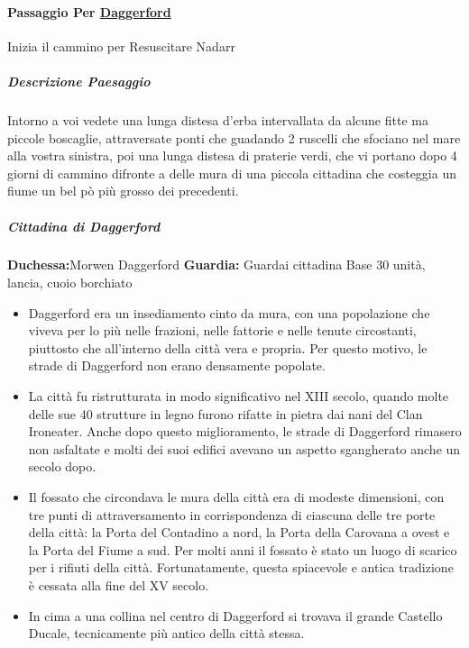 \documentclass{article}
\begin{document}
            \paragraph{Passaggio Per \href{https://forgottenmaps.web.app/map/Daggerford}{Daggerford}} Inizia il cammino per Resuscitare Nadarr
            \subparagraph{Descrizione Paesaggio} Intorno a voi vedete una lunga distesa d'erba intervallata da alcune fitte ma piccole boscaglie, attraversate ponti che guadando 2 ruscelli che sfociano nel mare alla vostra sinistra, poi una lunga distesa di praterie verdi, che vi portano dopo 4 giorni di cammino difronte a delle mura di una piccola cittadina che costeggia un fiume un bel pò più grosso dei precedenti.  

            \subparagraph{Cittadina di Daggerford}
                	\textbf{Duchessa:}Morwen Daggerford
                    \textbf{Guardia:} Guardai cittadina Base 30 unità, lancia, cuoio borchiato
            \begin{itemize}
                \item Daggerford era un insediamento cinto da mura, con una popolazione che viveva per lo più nelle frazioni, nelle fattorie e nelle tenute circostanti, piuttosto che all'interno della città vera e propria. Per questo motivo, le strade di Daggerford non erano densamente popolate.
                
                \item La città fu ristrutturata in modo significativo nel XIII secolo, quando molte delle sue 40 strutture in legno furono rifatte in pietra dai nani del Clan Ironeater. Anche dopo questo miglioramento, le strade di Daggerford rimasero non asfaltate e molti dei suoi edifici avevano un aspetto sgangherato anche un secolo dopo.
                
                \item Il fossato che circondava le mura della città era di modeste dimensioni, con tre punti di attraversamento in corrispondenza di ciascuna delle tre porte della città: la Porta del Contadino a nord, la Porta della Carovana a ovest e la Porta del Fiume a sud. Per molti anni il fossato è stato un luogo di scarico per i rifiuti della città. Fortunatamente, questa spiacevole e antica tradizione è cessata alla fine del XV secolo.
                
                \item In cima a una collina nel centro di Daggerford si trovava il grande Castello Ducale, tecnicamente più antico della città stessa.
            \end{itemize}
\end{document}
